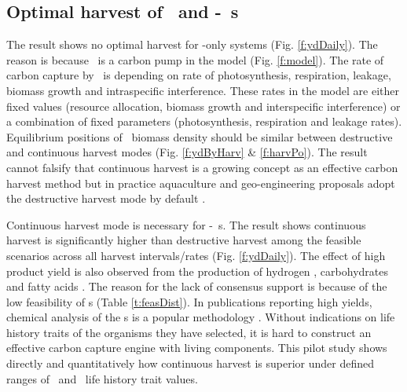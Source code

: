 \documentclass[../thesis.tex]{subfiles} %
\begin{document}
\subsection{Optimal harvest of \phy\ and \phy-\bac\ \pbs s}
The result shows no optimal harvest for \phy-only systems (Fig. \ref{f:ydDaily}).  The reason is because \phy\ is a carbon pump in the model (Fig. \ref{f:model}).  The rate of carbon capture by \phy\ is depending on rate of photosynthesis, respiration, leakage, biomass growth and intraspecific interference.  These rates in the model are either fixed values (resource allocation, biomass growth and interspecific interference) or a combination of fixed parameters (photosynthesis, respiration and leakage rates).  Equilibrium positions of \phy\ biomass density should be similar between destructive and continuous harvest modes (Fig. \ref{f:ydByHarv} \& \ref{f:harvPo}).  The result cannot falsify that continuous harvest is a growing concept as an effective carbon harvest method \autocite{fuentes2016impact} but in practice aquaculture and geo-engineering proposals adopt the destructive harvest mode by default \autocite{lawrence2014efficiency,krause2016substantial}.

Continuous harvest mode is necessary for \phy-\bac\ \pbs s.  The result shows continuous harvest is significantly higher than destructive harvest among the feasible scenarios across all harvest intervals/rates (Fig. \ref{f:ydDaily}).  The effect of high product yield is also observed from the production of hydrogen \autocite{kim2008anaerobic}, carbohydrates \autocite{choix2012enhanced1,choix2012enhanced2} and fatty acids \autocite{leyva2014accumulation}.  The reason for the lack of consensus support is because of the low feasibility of \pbs s (Table \ref{t:feasDist}).  In publications reporting high yields, chemical analysis of the \pbs s is a popular methodology \autocite{santos2014microalgal,rivas2010interactions,leyva2014accumulation,amin2009photolysis}.  Without indications on life history traits of the organisms they have selected, it is hard to construct an effective carbon capture engine with living components.  This pilot study shows directly and quantitatively how continuous harvest is superior under defined ranges of \phy\ and \bac\ life history trait values.
\end{document}
